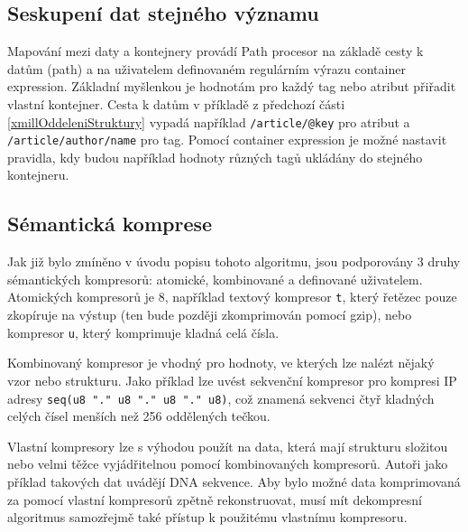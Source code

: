 \subsection{Seskupení dat stejného významu}
Mapování mezi daty a kontejnery provádí Path procesor na základě cesty k datům (path) a na uživatelem definovaném regulárním výrazu container expression. Základní myšlenkou je hodnotám pro každý tag nebo atribut přiřadit vlastní kontejner. Cesta k datům v příkladě z předchozí části \ref{xmillOddeleniStruktury} vypadá například \texttt{/article/@key} pro atribut a \texttt{/article/author/name} pro tag. Pomocí container expression je možné nastavit pravidla, kdy budou například hodnoty různých tagů ukládány do stejného kontejneru.\cite{xmill}

\subsection{Sémantická komprese}
Jak již bylo zmíněno v úvodu popisu tohoto algoritmu, jsou podporovány 3 druhy sémantických kompresorů: atomické, kombinované a definované uživatelem. Atomických kompresorů je 8, například textový kompresor \texttt{t}, který řetězec pouze zkopíruje na výstup (ten bude později zkomprimován pomocí gzip), nebo kompresor \texttt{u}, který komprimuje kladná celá čísla.

Kombinovaný kompresor je vhodný pro hodnoty, ve kterých lze nalézt nějaký vzor nebo strukturu. Jako příklad lze uvést sekvenční kompresor pro kompresi IP adresy \texttt{seq(u8 "." u8 "." u8 "." u8)}, což znamená sekvenci čtyř kladných celých čísel menších než 256 oddělených tečkou.

Vlastní kompresory lze s výhodou použít na data, která mají strukturu složitou nebo velmi těžce vyjádřitelnou pomocí kombinovaných kompresorů. Autoři jako příklad takových dat uvádějí DNA sekvence. Aby bylo možné data komprimovaná za pomocí vlastní kompresorů zpětně rekonstruovat, musí mít dekompresní algoritmus samozřejmě také přístup k použitému vlastnímu kompresoru.\cite{xmill}